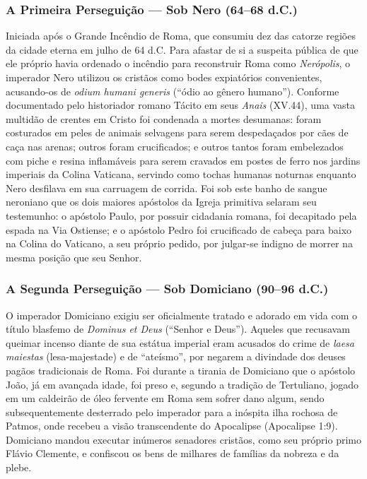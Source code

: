 \subsubsection*{A Primeira Perseguição — Sob Nero (64–68 d.C.)}
Iniciada após o Grande Incêndio de Roma, que consumiu dez das catorze regiões da cidade eterna em julho de 64 d.C. Para afastar de si a suspeita pública de que ele próprio havia ordenado o incêndio para reconstruir Roma como \textit{Nerópolis}, o imperador Nero utilizou os cristãos como bodes expiatórios convenientes, acusando-os de \textit{odium humani generis} (``ódio ao gênero humano''). Conforme documentado pelo historiador romano Tácito em seus \textit{Anais} (XV.44), uma vasta multidão de crentes em Cristo foi condenada a mortes desumanas: foram costurados em peles de animais selvagens para serem despedaçados por cães de caça nas arenas; outros foram crucificados; e outros tantos foram embelezados com piche e resina inflamáveis para serem cravados em postes de ferro nos jardins imperiais da Colina Vaticana, servindo como tochas humanas noturnas enquanto Nero desfilava em sua carruagem de corrida. Foi sob este banho de sangue neroniano que os dois maiores apóstolos da Igreja primitiva selaram seu testemunho: o apóstolo Paulo, por possuir cidadania romana, foi decapitado pela espada na Via Ostiense; e o apóstolo Pedro foi crucificado de cabeça para baixo na Colina do Vaticano, a seu próprio pedido, por julgar-se indigno de morrer na mesma posição que seu Senhor.


\subsubsection*{A Segunda Perseguição — Sob Domiciano (90–96 d.C.)}
O imperador Domiciano exigiu ser oficialmente tratado e adorado em vida com o título blasfemo de \textit{Dominus et Deus} (``Senhor e Deus''). Aqueles que recusavam queimar incenso diante de sua estátua imperial eram acusados do crime de \textit{laesa maiestas} (lesa-majestade) e de ``ateísmo'', por negarem a divindade dos deuses pagãos tradicionais de Roma. Foi durante a tirania de Domiciano que o apóstolo João, já em avançada idade, foi preso e, segundo a tradição de Tertuliano, jogado em um caldeirão de óleo fervente em Roma sem sofrer dano algum, sendo subsequentemente desterrado pelo imperador para a inóspita ilha rochosa de Patmos, onde recebeu a visão transcendente do Apocalipse (Apocalipse 1:9). Domiciano mandou executar inúmeros senadores cristãos, como seu próprio primo Flávio Clemente, e confiscou os bens de milhares de famílias da nobreza e da plebe.


